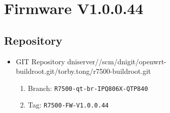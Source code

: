 \documentclass[12pt]{report}
\newcommand{\tlabel}[1]{
  \label{#1}%
  }
\begin{document}
\section{Firmware V1.0.0.44}

\tlabel{sec:1-0-1}
\subsection{Repository}
\begin{itemize}
	\item GIT Repository dniserver//scm/dnigit/openwrt-buildroot.git/torby.tong/r7500-buildroot.git
	\begin{enumerate}
		\item Branch: \texttt{R7500-qt-br-IPQ806X-QTP840}
                \item Tag: \texttt{R7500-FW-V1.0.0.44}
	\end{enumerate}
\end{itemize}
\end{document}
